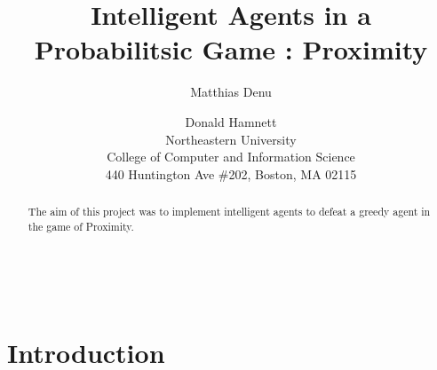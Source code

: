 \documentclass[letterpaper]{article}
\begin{document}
\setlength{pdfpagewidth}{8.5in}
\setlength{pdfpageheight}{11in}\\
%
%
%


\title{Intelligent Agents in a Probabilitsic Game : Proximity}
\author{Matthias Denu \and Donald Hamnett\\ 
Northeastern University \\ College of Computer and Information Science\\ 440 Huntington Ave \#202, Boston, MA 02115}

\maketitle 
\begin{abstract}
\par
The aim of this project was to implement intelligent agents to defeat a greedy agent in the game of Proximity.
\end{abstract}
\section{Introduction}
\par
\end{document}
